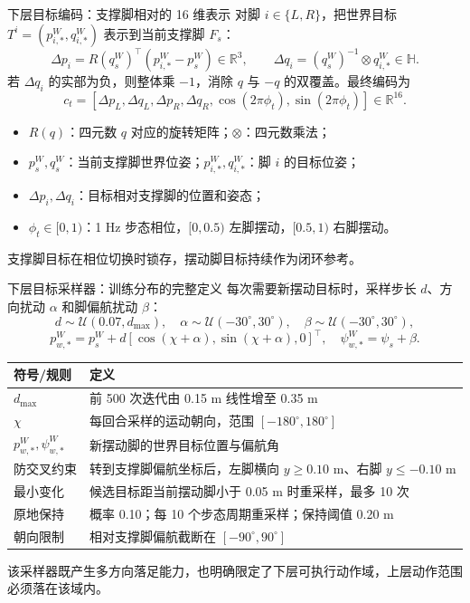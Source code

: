 \documentclass[aspectratio=169,10pt]{beamer}
\begin{document}
\begin{frame}{下层目标编码：支撑脚相对的 16 维表示}
\small
对脚 $i\in\{L,R\}$，把世界目标 $T^i=(p^W_{i,*},q^W_{i,*})$ 表示到当前支撑脚 $F_s$：
\[
\Delta p_i=R(q^W_s)^\top(p^W_{i,*}-p^W_s)\in\mathbb{R}^3,
\qquad
\Delta q_i=(q^W_s)^{-1}\otimes q^W_{i,*}\in\mathbb{H}.
\]
若 $\Delta q_i$ 的实部为负，则整体乘 $-1$，消除 $q$ 与 $-q$ 的双覆盖。最终编码为
\[
c_t=[\Delta p_L,\Delta q_L,\Delta p_R,\Delta q_R,
\cos(2\pi\phi_t),\sin(2\pi\phi_t)]\in\mathbb{R}^{16}.
\]
\begin{itemize}
  \item $R(q)$：四元数 $q$ 对应的旋转矩阵；$\otimes$：四元数乘法；
  \item $p^W_s,q^W_s$：当前支撑脚世界位姿；$p^W_{i,*},q^W_{i,*}$：脚 $i$ 的目标位姿；
  \item $\Delta p_i,\Delta q_i$：目标相对支撑脚的位置和姿态；
  \item $\phi_t\in[0,1)$：1 Hz 步态相位，$[0,0.5)$ 左脚摆动，$[0.5,1)$ 右脚摆动。
\end{itemize}
支撑脚目标在相位切换时锁存，摆动脚目标持续作为闭环参考。
\end{frame}

\begin{frame}{下层目标采样器：训练分布的完整定义}
\scriptsize
每次需要新摆动目标时，采样步长 $d$、方向扰动 $\alpha$ 和脚偏航扰动 $\beta$：
\[
d\sim\mathcal U(0.07,d_{\max}),\quad \alpha\sim\mathcal U(-30^\circ,30^\circ),
\quad\beta\sim\mathcal U(-30^\circ,30^\circ),
\]
\[
p^W_{w,*}=p^W_s+d[\cos(\chi+\alpha),\sin(\chi+\alpha),0]^\top,
\quad \psi^W_{w,*}=\psi_s+\beta.
\]
\begin{tabular}{p{}p{}}
\toprule
符号/规则 & 定义\\
\midrule
$d_{\max}$ & 前 500 次迭代由 0.15 m 线性增至 0.35 m\\
$\chi$ & 每回合采样的运动朝向，范围 $[-180^\circ,180^\circ]$\\
$p^W_{w,*},\psi^W_{w,*}$ & 新摆动脚的世界目标位置与偏航角\\
防交叉约束 & 转到支撑脚偏航坐标后，左脚横向 $y\ge0.10$ m、右脚 $y\le-0.10$ m\\
最小变化 & 候选目标距当前摆动脚小于 0.05 m 时重采样，最多 10 次\\
原地保持 & 概率 0.10；每 10 个步态周期重采样；保持阈值 0.20 m\\
朝向限制 & 相对支撑脚偏航截断在 $[-90^\circ,90^\circ]$\\
\bottomrule
\end{tabular}
\vspace{0.3em}
该采样器既产生多方向落足能力，也明确限定了下层可执行动作域，上层动作范围必须落在该域内。
\end{frame}
\end{document}
